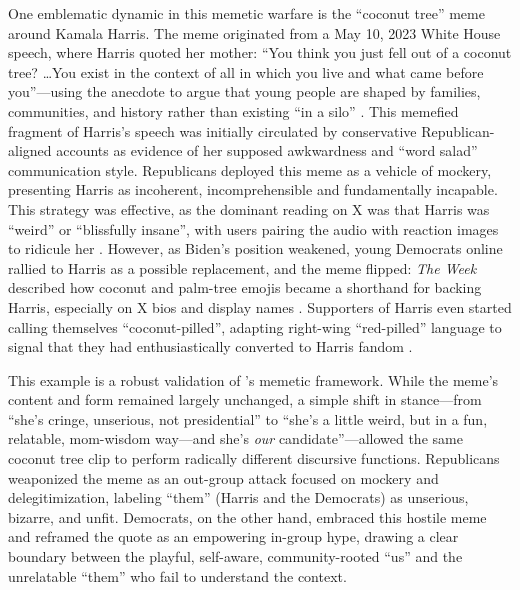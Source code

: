 \documentclass[12pt,twoside]{article}
\begin{document}

One emblematic dynamic in this memetic warfare is the ``coconut tree'' meme around Kamala Harris. The meme originated from a May 10, 2023 White House speech, where Harris quoted her mother: ``You think you just fell out of a coconut tree? \dots You exist in the context of all in which you live and what came before you''---using the anecdote to argue that young people are shaped by families, communities, and history rather than existing ``in a silo'' \parencite{harris2023swearinginremarks}. This memefied fragment of Harris's speech was initially circulated by conservative Republican-aligned accounts as evidence of her supposed awkwardness and ``word salad'' communication style. Republicans deployed this meme as a vehicle of mockery, presenting Harris as incoherent, incomprehensible and fundamentally incapable. This strategy was effective, as the dominant reading on X was that Harris was ``weird'' or ``blissfully insane'', with users pairing the audio with reaction images to ridicule her \parencite{carry2024coconuttreeguide}. However, as Biden's position weakened, young Democrats online rallied to Harris as a possible replacement, and the meme flipped: \textit{The Week} described how coconut and palm-tree emojis became a shorthand for backing Harris, especially on X bios and display names \parencite{coleman2024coconutmeme}. Supporters of Harris even started calling themselves ``coconut-pilled'', adapting right-wing ``red-pilled'' language to signal that they had enthusiastically converted to Harris fandom \parencite{roberts2024coconuttreeorganic}.

This example is a robust validation of \textcite{shifman2013memesdigitalculture}'s memetic framework.  While the meme's content and form remained largely unchanged,
a simple shift in stance---from ``she's cringe, unserious, not presidential'' to ``she's a little weird, but in a fun, relatable, mom-wisdom way—and she's \textit{our} candidate''---allowed the same coconut tree clip to perform radically different discursive functions. Republicans weaponized the meme as an out-group attack focused on mockery and delegitimization, labeling ``them'' (Harris and the Democrats) as unserious, bizarre, and unfit. Democrats, on the other hand, embraced this hostile meme and reframed the quote as an empowering in-group hype, drawing a clear boundary between the playful, self-aware, community-rooted ``us'' and the unrelatable ``them'' who fail to understand the context.
\end{document}
